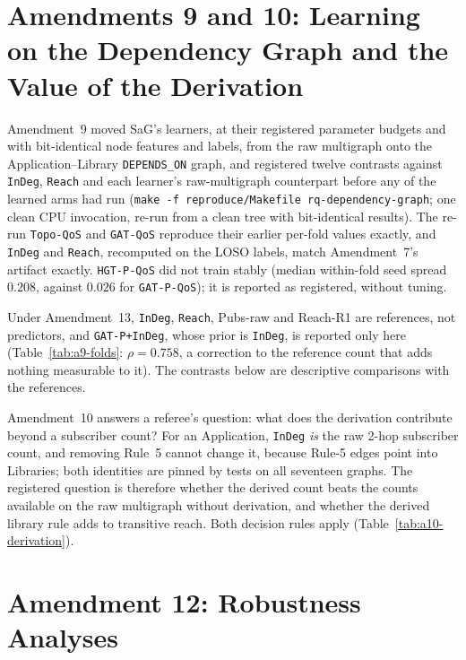 \documentclass[preprint,3p]{elsarticle}
\begin{document}


\section{Amendments 9 and 10: Learning on the Dependency Graph and the Value of the Derivation}
\label{supp:amendment9}

Amendment~9 moved SaG's learners, at their registered parameter budgets and with bit-identical node features and labels, from the raw multigraph onto the Application--Library \texttt{DEPENDS\_ON} graph, and registered twelve contrasts against \texttt{InDeg}, \texttt{Reach} and each learner's raw-multigraph counterpart before any of the learned arms had run (\texttt{make -f reproduce/Makefile rq-dependency-graph}; one clean CPU invocation, re-run from a clean tree with bit-identical results). The re-run \texttt{Topo-QoS} and \texttt{GAT-QoS} reproduce their earlier per-fold values exactly, and \texttt{InDeg} and \texttt{Reach}, recomputed on the LOSO labels, match Amendment~7's artifact exactly. \texttt{HGT-P-QoS} did not train stably (median within-fold seed spread $0.208$, against $0.026$ for \texttt{GAT-P-QoS}); it is reported as registered, without tuning.

Under Amendment~13, \texttt{InDeg}, \texttt{Reach}, Pubs-raw and Reach-R1 are references, not predictors, and \texttt{GAT-P+InDeg}, whose prior is \texttt{InDeg}, is reported only here (Table~\ref{tab:a9-folds}: $\rho = 0.758$, a correction to the reference count that adds nothing measurable to it). The contrasts below are descriptive comparisons with the references.

Amendment~10 answers a referee's question: what does the derivation contribute beyond a subscriber count? For an Application, \texttt{InDeg} \emph{is} the raw 2-hop subscriber count, and removing Rule~5 cannot change it, because Rule-5 edges point into Libraries; both identities are pinned by tests on all seventeen graphs. The registered question is therefore whether the derived count beats the counts available on the raw multigraph without derivation, and whether the derived library rule adds to transitive reach. Both decision rules apply (Table~\ref{tab:a10-derivation}).




\section{Amendment 12: Robustness Analyses}
\label{supp:referee}
\end{document}
